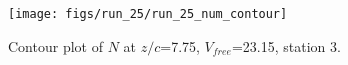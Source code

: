 \begin{figure}[H]
\centering
\texttt{[image: figs/run\_25/run\_25\_num\_contour]}
\caption{Contour plot of $N$ at $z/c$=7.75, $V_{free}$=23.15, station 3.}
\label{fig:run_25_num_contour}
\end{figure}


